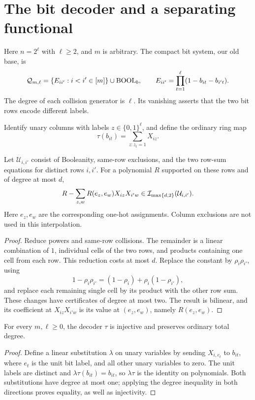 \section{The bit decoder and a separating functional}\label{sec:decoder}

Here \(n=2^\ell\) with \(\ell\ge2\), and \(m\) is arbitrary.
The compact bit system, our old base, is
\begin{equation}\label{eq:compact-base}
 \mathcal Q_{m,\ell}
  =\{E_{ii'}:i<i'\in[m]\}\cup\operatorname{BOOL}_b,
 \qquad
 E_{ii'}=\prod_{t=1}^{\ell}(1-b_{it}-b_{i't}).
\end{equation}
The degree of each collision generator is \(\ell\).
Its vanishing asserts that the two bit rows encode different labels.

Identify unary columns with labels \(z\in\{0,1\}^{\ell}\), and define the
ordinary ring map
\begin{equation}\label{eq:decoder}
 \tau(b_{it})=\sum_{z:z_t=1}X_{iz}.
\end{equation}

\begin{lemma}\label{lem:interpolation}
Let \(\mathcal U_{i,i'}\) consist of Booleanity, same-row exclusions,
and the two row-sum equations for distinct rows \(i,i'\).
For a polynomial \(R\) supported on these rows and of degree at most \(d\),
\[
 R-\sum_{z,w}R(e_z,e_w)X_{iz}X_{i'w}
     \in\mathcal I_{\max\{d,2\}}(\mathcal U_{i,i'}).
\]
Here \(e_z,e_w\) are the corresponding one-hot assignments.
Column exclusions are not used in this interpolation.
\end{lemma}
\begin{proof}
Reduce powers and same-row collisions. The remainder is a linear
combination of \(1\), individual cells of the two rows, and products
containing one cell from each row. This reduction costs at most \(d\).
Replace the constant by \(\rho_i\rho_{i'}\), using
\[
 1-\rho_i\rho_{i'}=(1-\rho_i)+\rho_i(1-\rho_{i'}),
\]
and replace each remaining single cell by its product with the other
row sum. These changes have certificates of degree at most two.
The result is bilinear, and its coefficient at \(X_{iz}X_{i'w}\)
is its value at \((e_z,e_w)\), namely \(R(e_z,e_w)\).
\end{proof}


\begin{lemma}\label{lem:decoder-injective}
For every \(m,\ell\ge0\), the decoder \(\tau\) is injective and preserves
ordinary total degree.
\end{lemma}
\begin{proof}
Define a linear substitution \(\lambda\) on unary variables by sending
\(X_{i,e_t}\) to \(b_{it}\), where \(e_t\) is the unit bit label, and
all other unary variables to zero. The unit labels are distinct and
\(\lambda\tau(b_{it})=b_{it}\), so \(\lambda\tau\) is the identity
on polynomials. Both substitutions have degree at most one; applying the
degree inequality in both directions proves equality, as well as injectivity.
\end{proof}

